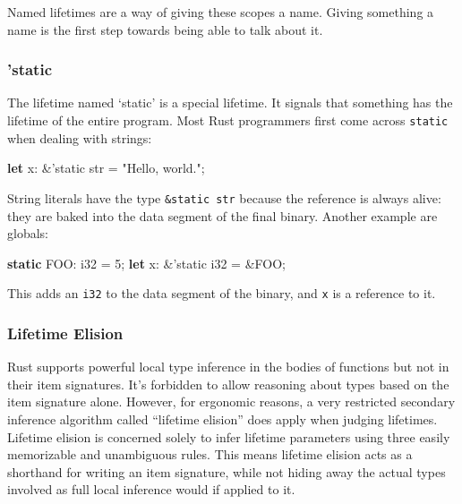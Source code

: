 \documentclass[a4paper,]{book}
\newenvironment{Shaded}{\begin{snugshade}}{\end{snugshade}}
\newcommand{\KeywordTok}[1]{\textcolor[rgb]{0.13,0.29,0.53}{\textbf{{#1}}}}
\newcommand{\DataTypeTok}[1]{\textcolor[rgb]{0.13,0.29,0.53}{{#1}}}
\newcommand{\DecValTok}[1]{\textcolor[rgb]{0.00,0.00,0.81}{{#1}}}
\newcommand{\StringTok}[1]{\textcolor[rgb]{0.31,0.60,0.02}{{#1}}}
\newcommand{\OtherTok}[1]{\textcolor[rgb]{0.56,0.35,0.01}{{#1}}}
\newcommand{\NormalTok}[1]{{#1}}
\begin{document}
Named lifetimes are a way of giving these scopes a name. Giving
something a name is the first step towards being able to talk about it.

\hypertarget{static}{\subsubsection{'static}\label{static}}

The lifetime named `static' is a special lifetime. It signals that
something has the lifetime of the entire program. Most Rust programmers
first come across \texttt{\textquotesingle{}static} when dealing with
strings:

\begin{Shaded}
\begin{Highlighting}[]
\KeywordTok{let} \NormalTok{x: &}\OtherTok{'static} \DataTypeTok{str} \NormalTok{= }\StringTok{"Hello, world."}\NormalTok{;}
\end{Highlighting}
\end{Shaded}

String literals have the type \texttt{\&\textquotesingle{}static\ str}
because the reference is always alive: they are baked into the data
segment of the final binary. Another example are globals:

\begin{Shaded}
\begin{Highlighting}[]
\KeywordTok{static} \NormalTok{FOO: }\DataTypeTok{i32} \NormalTok{= }\DecValTok{5}\NormalTok{;}
\KeywordTok{let} \NormalTok{x: &}\OtherTok{'static} \DataTypeTok{i32} \NormalTok{= &FOO;}
\end{Highlighting}
\end{Shaded}

This adds an \texttt{i32} to the data segment of the binary, and
\texttt{x} is a reference to it.

\hypertarget{lifetime-elision}{\subsubsection{Lifetime
Elision}\label{lifetime-elision}}

Rust supports powerful local type inference in the bodies of functions
but not in their item signatures. It's forbidden to allow reasoning
about types based on the item signature alone. However, for ergonomic
reasons, a very restricted secondary inference algorithm called
``lifetime elision'' does apply when judging lifetimes. Lifetime elision
is concerned solely to infer lifetime parameters using three easily
memorizable and unambiguous rules. This means lifetime elision acts as a
shorthand for writing an item signature, while not hiding away the
actual types involved as full local inference would if applied to it.
\end{document}
